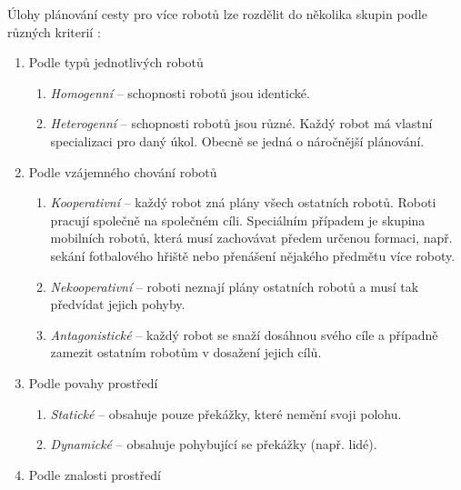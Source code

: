 Úlohy plánování cesty pro více robotů lze rozdělit do několika skupin podle různých kriterií 
\cite{Koubaa20180406,Yu20140122,Asma2017,Solovey20160408,Silver2005,Alajlan2013}:
\begin{enumerate}
	\item Podle typů jednotlivých robotů
	\begin{enumerate}
		\item \emph{Homogenní} -- schopnosti robotů jsou identické.
		\item \emph{Heterogenní} -- schopnosti robotů jsou různé. Každý robot má vlastní specializaci pro daný úkol. Obecně se jedná o náročnější plánování.
	\end{enumerate}
\clearpage
	\item Podle vzájemného chování robotů
	\begin{enumerate}
		\item \emph{Kooperativní} -- každý robot zná plány všech ostatních robotů. Roboti pracují společně na společném cíli. Speciálním případem je skupina mobilních robotů, která musí zachovávat předem určenou formaci, např. sekání fotbalového hřiště nebo přenášení nějakého předmětu více roboty.
		\item \emph{Nekooperativní} -- roboti neznají plány ostatních robotů a musí tak předvídat jejich pohyby.
		\item \emph{Antagonistické} -- každý robot se snaží dosáhnou svého cíle a případně zamezit ostatním robotům v dosažení jejich cílů.
	\end{enumerate}
	\item Podle povahy prostředí
	\begin{enumerate}
		\item \emph{Statické} -- obsahuje pouze překážky, které nemění svoji polohu.
		\item \emph{Dynamické} -- obsahuje pohybující se překážky (např. lidé).
	\end{enumerate}
	\item Podle znalosti prostředí
	\begin{enumerate}

\end{enumerate}
\end{enumerate}
